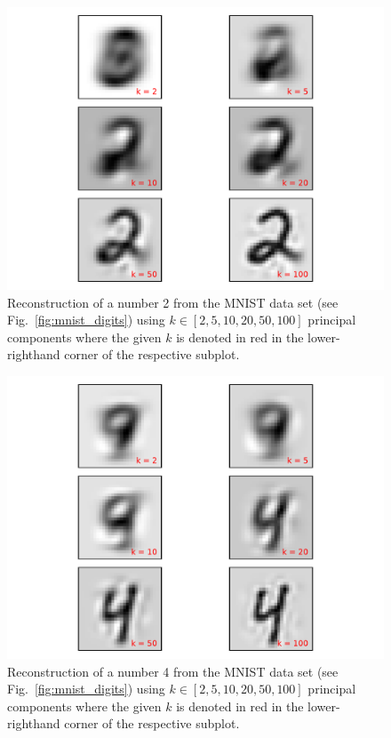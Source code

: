 \documentclass[12pt]{amsart}
\begin{document}
\begin{figure}[H]
	\includegraphics[width=\columnwidth]{2_recon_mnist.pdf}
    \caption{Reconstruction of a number 2 from the MNIST data set (see Fig.~\ref{fig:mnist_digits}) using $k \in [2,5,10,20,50,100]$ principal components where the given $k$ is denoted in red in the lower-righthand corner of the respective subplot.}
    \label{fig:recon_2}
\end{figure}
\begin{figure}[H]
	\includegraphics[width=\columnwidth]{4_recon_mnist.pdf}
    \caption{Reconstruction of a number 4 from the MNIST data set (see Fig.~\ref{fig:mnist_digits}) using $k \in [2,5,10,20,50,100]$ principal components where the given $k$ is denoted in red in the lower-righthand corner of the respective subplot.}
    \label{fig:recon_4}
\end{figure}
\end{document}
